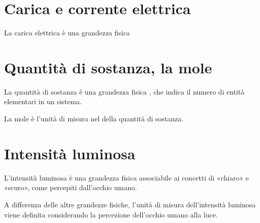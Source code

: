 \documentclass[letterpaper,10pt,italian]{jupyterBook}
\begin{document}
\sphinxAtStartPar
{}

\sphinxstepscope


\section{Carica e corrente elettrica}
\label{\detokenize{ch/intro/physical_quantities-charge:carica-e-corrente-elettrica}}\label{\detokenize{ch/intro/physical_quantities-charge:physics-hs-intro-physical-quantities-charge}}\label{\detokenize{ch/intro/physical_quantities-charge::doc}}
\sphinxAtStartPar
La carica elettrica è una grandezza fisica

\sphinxAtStartPar
{}

\sphinxstepscope


\section{Quantità di sostanza, la mole}
\label{\detokenize{ch/intro/physical_quantities-mole:quantita-di-sostanza-la-mole}}\label{\detokenize{ch/intro/physical_quantities-mole:physics-hs-intro-physical-quantities-mole}}\label{\detokenize{ch/intro/physical_quantities-mole::doc}}
\sphinxAtStartPar
La quantità di sostanza è una grandezza fisica , che indica il numero di entità elementari in un sistema.

\sphinxAtStartPar
{} La mole è l’unità di misura nel {\hyperref[\detokenize{ch/intro::doc}]{}} della quantità di sostanza.

\sphinxstepscope


\section{Intensità luminosa}
\label{\detokenize{ch/intro/physical_quantities-luminosity:intensita-luminosa}}\label{\detokenize{ch/intro/physical_quantities-luminosity:physics-hs-intro-physical-quantities-luminosity}}\label{\detokenize{ch/intro/physical_quantities-luminosity::doc}}
\sphinxAtStartPar
L’intensità luminosa è una grandezza fisica associabile ai concetti di «chiaro» e «scuro», come percepiti dall’occhio umano.

\sphinxAtStartPar
{} A differenza delle altre grandezze fisiche, l’unità di misura dell’intensità luminosa viene definita considerando la percezione dell’occhio umano alla luce.
\end{document}
